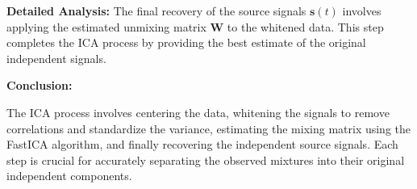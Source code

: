 \documentclass{exam}
\begin{document}
\textbf{Detailed Analysis:} The final recovery of the source signals \( \mathbf{s}(t) \) involves applying the estimated unmixing matrix \( \mathbf{W} \) to the whitened data. This step completes the ICA process by providing the best estimate of the original independent signals.

\textbf{Conclusion:}

The ICA process involves centering the data, whitening the signals to remove correlations and standardize the variance, estimating the mixing matrix using the FastICA algorithm, and finally recovering the independent source signals. Each step is crucial for accurately separating the observed mixtures into their original independent components.
\end{document}
